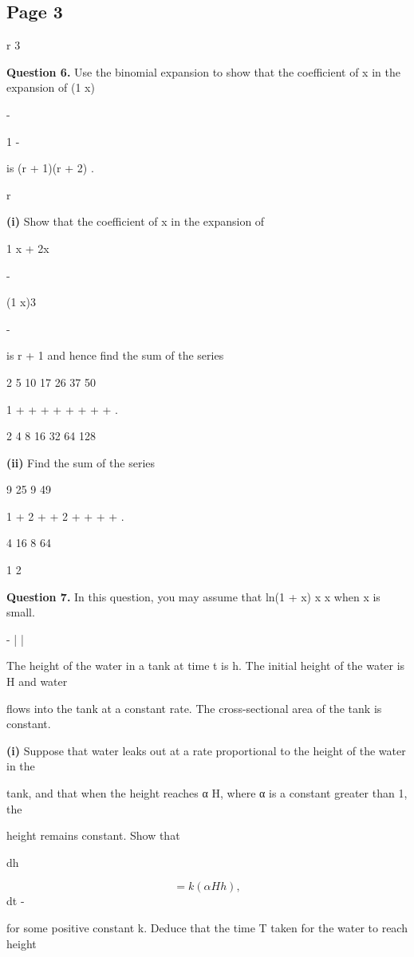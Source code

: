 \documentclass[12pt]{article}
\begin{document}
\subsection*{Page 3}
\begin{flushleft}
r 3\par
\bigskip\textbf{Question 6.} Use the binomial expansion to show that the coefficient of x in the expansion of (1 x)\par
-\par
1 -\par
is (r + 1)(r + 2) .\par
r\par
\textbf{(i)} Show that the coefficient of x in the expansion of\par
1 x + 2x\par
-\par
(1 x)3\par
-\par
is r + 1 and hence find the sum of the series\par
2 5 10 17 26 37 50\par
1 + + + + + + + + .\par
2 4 8 16 32 64 128 \cdots\par
\textbf{(ii)} Find the sum of the series\par
9 25 9 49\par
1 + 2 + + 2 + + + + .\par
4 16 8 64 \cdots\par
1 2\par
\bigskip\textbf{Question 7.} In this question, you may assume that ln(1 + x) x x when x is small.\par
\approx - | |\par
The height of the water in a tank at time t is h. The initial height of the water is H and water\par
flows into the tank at a constant rate. The cross-sectional area of the tank is constant.\par
\textbf{(i)} Suppose that water leaks out at a rate proportional to the height of the water in the\par
tank, and that when the height reaches α H, where α is a constant greater than 1, the\par
height remains constant. Show that\par
dh\par
\[= k(α H h) ,\]
dt -\par
for some positive constant k. Deduce that the time T taken for the water to reach height\par

\end{flushleft}
\end{document}
